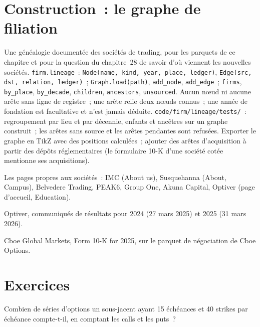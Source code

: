 \section{Construction~: le graphe de filiation}\label{bld:in:the-options-market-making-houses:lineage}

\begin{build}
 Une généalogie documentée des sociétés de trading, pour les parquets de ce chapitre et pour la question du chapitre~28 de savoir
d'où viennent les nouvelles sociétés.
 \texttt{firm.lineage}~: \texttt{Node(name, kind, year, place, ledger)},
\texttt{Edge(src, dst, relation, ledger)}~; \texttt{Graph.load(path)}, \texttt{add\_node}, \texttt{add\_edge}~; \texttt{firms}, \texttt{by\_place},
\texttt{by\_decade}, \texttt{children}, \texttt{ancestors}, \texttt{unsourced}.
 Aucun nœud ni aucune arête sans ligne de registre~; une arête relie deux nœuds connus~; une année de fondation est facultative et
n'est jamais déduite.
 \texttt{code/firm/lineage/tests/}~: regroupement par lieu et par décennie, enfants et ancêtres sur un
graphe construit~; les arêtes sans source et les arêtes pendantes sont refusées.
 Exporter le graphe en TikZ avec des positions calculées~; ajouter des arêtes d'acquisition à partir des dépôts réglementaires (le
formulaire 10-K d'une société cotée mentionne ses acquisitions).
\end{build}

\begin{omsources}
\item Les pages propres aux sociétés~: IMC (About us), Susquehanna (About, Campus), Belvedere Trading, PEAK6, Group One, Akuna
Capital, Optiver (page d'accueil, Education).
\item Optiver, communiqués de résultats pour 2024 (27 mars 2025) et 2025 (31 mars 2026).
\item Cboe Global Markets, Form 10-K for 2025, sur le parquet de négociation de Cboe Options.
\end{omsources}

\section{Exercices}

\begin{exercise}[$\star$]\label{exo:in:the-options-market-making-houses:1}
Combien de séries d'options un sous-jacent ayant 15 échéances et 40 strikes par échéance compte-t-il, en comptant les calls et les puts~?
\end{exercise}

